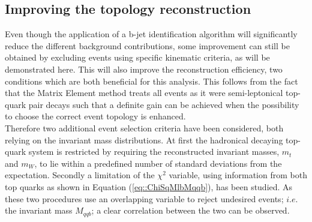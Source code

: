 \subsection{Improving the topology reconstruction}\label{subsec::MassCuts}
Even though the application of a b-jet identification algorithm will significantly reduce the different background contributions, some improvement can still be obtained by excluding events using specific kinematic criteria, as will be demonstrated here. This will also improve the reconstruction efficiency, two conditions which are both beneficial for this analysis.
This follows from the fact that the Matrix Element method treats all events as it were semi-leptonical top-quark pair decays such that a definite gain can be achieved when the possibility to choose the correct event topology is enhanced.
\\
Therefore two additional event selection criteria have been considered, both relying on the invariant mass distributions. %
At first the hadronical decaying top-quark system is restricted by requiring the reconstructed invariant masses, $m_t$ and $m_W$, to lie within a predefined number of standard deviations from the expectation. Secondly a limitation of the $\chi^{2}$ variable, using information from both top quarks as shown in Equation (\ref{eq::ChiSqMlbMqqb}), has been studied.
As these two procedures use an overlapping variable to reject undesired events; $i.e.$ the invariant mass $M_{qqb}$; a clear correlation between the two can be observed.
%
\\

